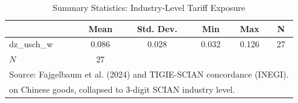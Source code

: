 \begin{table}[htbp]\centering
\def\sym#1{\ifmmode^{#1}\else\(^{#1}\)\fi}
\caption{Summary Statistics: Industry-Level Tariff Exposure}
\begin{tabular}{l*{1}{ccccc}}
\hline\hline
            &        Mean&   Std. Dev.&         Min&         Max&           N\\
\hline
dz\_usch\_w   &       0.086&       0.028&       0.032&       0.126&          27\\
\hline
\(N\)       &          27&            &            &            &            \\
\hline\hline
\multicolumn{6}{l}{\footnotesize Source: Fajgelbaum et al. (2024) and TIGIE-SCIAN concordance (INEGI).}\\
\multicolumn{6}{l}{\footnotesize on Chinese goods, collapsed to 3-digit SCIAN industry level.}\\
\end{tabular}
\end{table}
